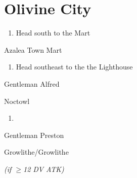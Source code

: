 \chapter{Olivine City}
\vspace{0.5mm}

\begin{paracol}{2}
\begin{enumerate}
	\item Head south to the Mart
\end{enumerate}

\begin{shop}{Azalea Town Mart}
	\varwb
	\begin{buy}
		\item \shopHl{(\pointDown)} \superPotion{} 
		\item \shopHl{(6\pointDown)} \superRepel{} 
	\end{buy}
	\varwe
\end{shop}

\begin{enumerate}[resume]
	\item Head southeast to the the Lighthouse
\end{enumerate}

\begin{trainer}{Gentleman Alfred}
	\varwb
	\begin{fightSection}{Noctowl}
		\item {} \headbutt
		\item {} \surf
	\end{fightSection}
	\varwe
\end{trainer}

\begin{enumerate}[resume]
	\item {}
\end{enumerate}

\begin{trainer}{Gentleman Preston}
	\varwb
	\begin{fightSection}{Growlithe/Growlithe}
		\item {} \waterGun{} 
		\begin{notes}
			\small{\item {} \headbutt{} \textit{(if $\geq$12 DV ATK)}}
		\end{notes}
	\end{fightSection}
	\varwe
\end{trainer}


\end{paracol}
